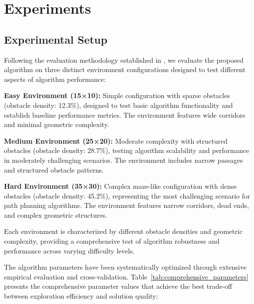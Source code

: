 \documentclass[pdflatex,sn-mathphys-num]{sn-jnl}
\theoremstyle{thmstyleone}%
\theoremstyle{thmstyletwo}%
\theoremstyle{thmstylethree}%
\begin{document}
\section{Experiments}\label{sec4}

\subsection{Experimental Setup}\label{subsec1}

Following the evaluation methodology established in \cite{8}, we evaluate the proposed algorithm on three distinct environment configurations designed to test different aspects of algorithm performance:

{
\setlength{\parindent}{0pt}
 \textbf{Easy Environment (15×10):} Simple configuration with sparse obstacles (obstacle density: 12.3\%), designed to test basic algorithm functionality and establish baseline performance metrics. The environment features wide corridors and minimal geometric complexity.
    
\textbf{Medium Environment (25×20):} Moderate complexity with structured obstacles (obstacle density: 28.7\%), testing algorithm scalability and performance in moderately challenging scenarios. The environment includes narrow passages and structured obstacle patterns.
    
\textbf{Hard Environment (35×30):} Complex maze-like configuration with dense obstacles (obstacle density: 45.2\%), representing the most challenging scenario for path planning algorithms. The environment features narrow corridors, dead ends, and complex geometric structures.}

Each environment is characterized by different obstacle densities and geometric complexity, providing a comprehensive test of algorithm robustness and performance across varying difficulty levels.

The algorithm parameters have been systematically optimized through extensive empirical evaluation and cross-validation. Table~\ref{tab:comprehensive_parameters} presents the comprehensive parameter values that achieve the best trade-off between exploration efficiency and solution quality:
\end{document}
